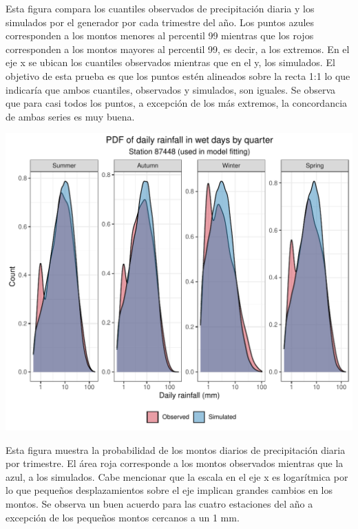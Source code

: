 \documentclass[
]{article}
\begin{document}
Esta figura compara los cuantiles observados de precipitación diaria y los simulados por el generador por cada trimestre del año. Los puntos azules corresponden a los montos menores al percentil 99 mientras que los rojos corresponden a los montos mayores al percentil 99, es decir, a los extremos. En el eje x se ubican los cuantiles observados mientras que en el y, los simulados. El objetivo de esta prueba es que los puntos estén alineados sobre la recta 1:1 lo que indicaría que ambos cuantiles, observados y simulados, son iguales. Se observa que para casi todos los puntos, a excepción de los más extremos, la concordancia de ambas series es muy buena.

\begin{center}\includegraphics{Webinario_Generador_files/figure-latex/unnamed-chunk-35-1} \end{center}

Esta figura muestra la probabilidad de los montos diarios de precipitación diaria por trimestre. El área roja corresponde a los montos observados mientras que la azul, a los simulados. Cabe mencionar que la escala en el eje x es logarítmica por lo que pequeños desplazamientos sobre el eje implican grandes cambios en los montos. Se observa un buen acuerdo para las cuatro estaciones del año a excepción de los pequeños montos cercanos a un 1 mm.
\end{document}

